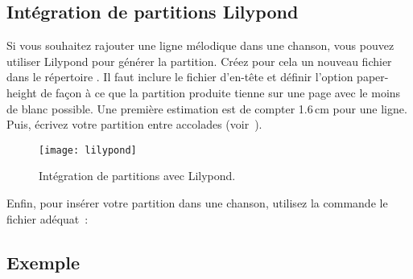 \subsection{Intégration de partitions Lilypond}

Si vous souhaitez rajouter une ligne mélodique dans une chanson, vous
pouvez utiliser Lilypond pour générer la partition. Créez pour cela
un nouveau fichier  dans le répertoire
. Il faut inclure le fichier d'en-tête
 et définir l'option paper-height de façon à ce que la
partition produite tienne sur une page avec le moins de blanc
possible. Une première estimation est de compter 1.6\,cm pour une
ligne. Puis, écrivez votre partition entre accolades
(voir~).

\begin{figure}
  \begin{minipage}[b]{\linewidth}
    \centering
    \texttt{[image: lilypond]}
    \vspace{0.5cm}
  \end{minipage}

  \begin{minipage}[b]{\linewidth}
  \end{minipage}
  \caption{Intégration de partitions avec Lilypond.}
  \label{fig:lilypond}
\end{figure}

Enfin, pour insérer votre partition  dans une
chanson, utilisez la commande  le fichier
 adéquat~:

\begin{songbook}
\end{songbook}

\subsection{Exemple}

